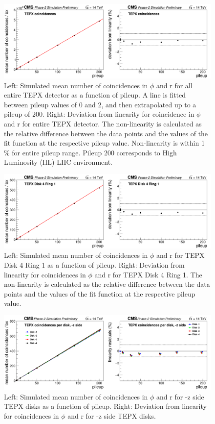 \begin{figure}[H]
  \centering
  \includegraphics[width=1 \columnwidth]{./totalcoincidences.png}
  \caption{Left: Simulated mean number of coincidences in $\phi$ and r for all entire TEPX detector as a function of pileup. A line is fitted between pileup values of 0 and 2, and then extrapolated up to a pileup of 200. Right: Deviation from linearity for coincidence in $\phi$ and r for entire TEPX detector. The non-linearity is calculated as the relative difference between the data points and the values of the fit function at the respective pileup value. Non-linearity is within 1 \% for entire pileup range. Pileup 200 corresponds to High Luminosity (HL)-LHC environment.}
  \label{fig:CMS}
\end{figure}


\begin{figure}[H]
  \centering
  \includegraphics[width=1\columnwidth]{./totalcoincidencesD4R1.png}
  \caption{Left: Simulated mean number of coincidences in $\phi$ and r for TEPX Disk 4 Ring 1 as a function of pileup. Right: Deviation from linearity for coincidences in $\phi$ and r for TEPX Disk 4 Ring 1. The non-linearity is calculated as the relative difference between the data points and the values of the fit function at the respective pileup value.}
  \label{fig:CMS}
\end{figure}


\begin{figure}[H]
  \centering
  \includegraphics[width=1\columnwidth]{.//coincidencesperdisk-z.png}
  \caption{Left: Simulated mean number of coincidences in $\phi$ and r for -z side TEPX disks as a function of pileup. Right: Deviation from linearity for coincidences in $\phi$ and r for -z side TEPX disks.}
  \label{fig:CMS}
\end{figure}


